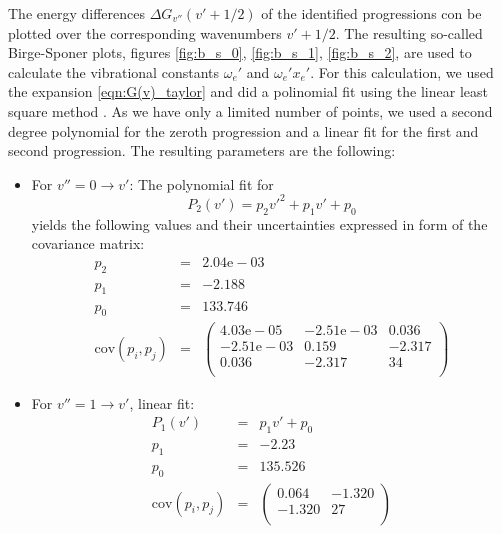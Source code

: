 The energy differences $\Delta G_{v''}(v' + 1/2)$ of the identified progressions con 
be plotted over the corresponding wavenumbers $v' + 1/2$. The resulting so-called 
Birge-Sponer plots, figures 
\ref{fig:b_s_0}, \ref{fig:b_s_1}, \ref{fig:b_s_2}, 
are used to calculate the vibrational constants $\omega_e'$ and $\omega_e' x_e'$. 
For this calculation, we used the expansion \eqref{eqn:G(v)_taylor} and did a 
polinomial fit using the linear least square method \cite{cowan1998statistical}. 
As we have only a limited number of points, we used a second degree polynomial
for the zeroth progression and a linear fit for the first and second progression. 
The resulting parameters are the following:
\begin{itemize}
    \item For $v'' = 0 \rightarrow v'$: The polynomial fit for 
        \begin{equation}
            P_2(v') = p_2 {v'}^2 + p_1 v' + p_0
        \end{equation}
        yields the following values and their uncertainties expressed in form of 
        the covariance matrix:
        \begin{eqnarray}
            p_2 &=& 2.04\mathrm{e}-03 \\
            p_1 &=& -2.188 \\
            p_0 &=& 133.746 \\
            \mathrm{cov}(p_i, p_j) &=& 
            \begin{pmatrix}
                 4.03\mathrm{e}-05 & -2.51\mathrm{e}-03 & 0.036 \\
                 -2.51\mathrm{e}-03 & 0.159 & -2.317 \\
                 0.036 & -2.317 & 34 \\
            \end{pmatrix}
        \end{eqnarray}
    \item For $v'' = 1 \rightarrow v'$, linear fit:
        \begin{eqnarray}
            P_1(v') &=& p_1 v' + p_0 \\
            p_1 &=& -2.23 \\
            p_0 &=& 135.526 \\
            \mathrm{cov}(p_i, p_j) &=& 
            \begin{pmatrix}
                 0.064 & -1.320 \\
                 -1.320 & 27 \\
            \end{pmatrix}

\end{eqnarray}
\end{itemize}
